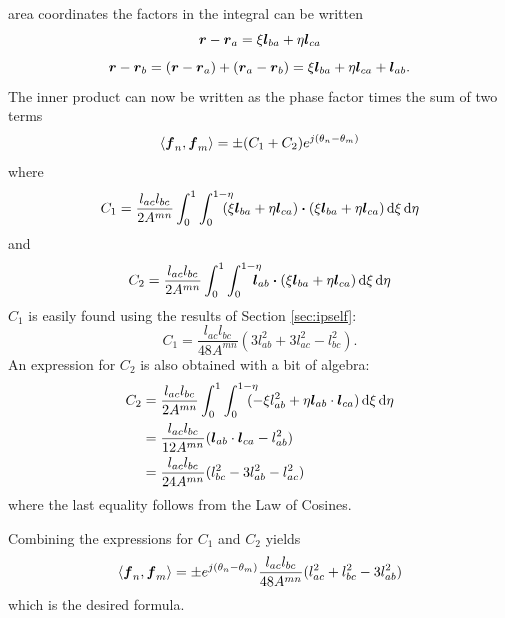 \documentclass[
letterpaper, %
11pt, %
oneside, 
onecolumn, %
openany, %
]{memoir}
\numberwithin{equation}{chapter}
\numberwithin{figure}{chapter}
\begin{document}
area coordinates the factors in the integral can be written
\begin{equation}
  \boldsymbol{r} - \boldsymbol{r}_a = \xi \boldsymbol{l}_{ba} + \eta \boldsymbol{l}_{ca}
\end{equation}
\begin{equation}
  \boldsymbol{r} - \boldsymbol{r}_b = (\boldsymbol{r}-\boldsymbol{r}_a) + (\boldsymbol{r}_a - \boldsymbol{r}_b) = \xi \boldsymbol{l}_{ba} + \eta \boldsymbol{l}_{ca} + 
                                  \boldsymbol{l}_{ab}.
\end{equation}
The inner product can now be written as the phase factor times the 
sum of two terms
\begin{equation}
  \left< \boldsymbol{f}_n, \boldsymbol{f}_m \right> = \pm (C_1 + C_2) e^{j(\theta_n-\theta_m)}
\end{equation}
 where
\begin{equation}
  C_1 =  \frac{l_{ac}l_{bc}}{2A^{mn}}\int_0^1 \int_0^{1-\eta}
  \!\!\!\!\!
              (\xi\boldsymbol{l}_{ba} + \eta\boldsymbol{l}_{ca}) \boldsymbol{\cdot}
              (\xi\boldsymbol{l}_{ba} + \eta\boldsymbol{l}_{ca})  \, \text{d}\xi\, \text{d}\eta  
\end{equation}
and
\begin{equation}
  C_2 =  \frac{l_{ac}l_{bc}}{2A^{mn}}\int_0^1 \int_0^{1-\eta}
  \!\!\!\!\!  \boldsymbol{l}_{ab}  \boldsymbol{\cdot}
              (\xi\boldsymbol{l}_{ba} + \eta\boldsymbol{l}_{ca})  \, \text{d}\xi\, \text{d}\eta  
\end{equation}
$C_1$ is easily found using the results of Section \ref{sec:ipself}:
\begin{equation}                                  
  C_1 = \frac{l_{ac}l_{bc}}{48A^{mn}}
       (3l_{ab}^2 + 3l_{ac}^2 - l_{bc}^2).
\end{equation}
An expression for $C_2$ is also obtained with a bit of algebra:
\begin{align}
  C_2 &= \frac{l_{ac}l_{bc}}{2A^{mn}}\int_0^1 \int_0 ^{1-\eta}
  \!\!\!\!\!
           (-\xi l_{ab}^2 + \eta \boldsymbol{l}_{ab} \cdot \boldsymbol{l}_{ca} ) \, \text{d}\xi \, \text{d}\eta
                   \nonumber \\
       &=  \frac{l_{ac}l_{bc}}{12A^{mn}} ( \boldsymbol{l}_{ab} \cdot \boldsymbol{l}_{ca} - l_{ab}^2)
                   \nonumber \\
       & =  \frac{l_{ac}l_{bc}}{24 A^{mn}} (l_{bc}^2 - 3l_{ab}^2 - l_{ac}^2)
\end{align}
where the last equality follows from the Law of Cosines.

Combining the expressions for $C_1$ and $C_2$ yields
\begin{equation}
  \left< \boldsymbol{f}_n,\boldsymbol{f}_m \right> = \pm e^{j(\theta_n-\theta_m)}
  \frac{l_{ac}l_{bc}}{48A^{mn}}(l_{ac}^2+l_{bc}^2 
                               - 3 l_{ab}^2)
\end{equation}
which is the desired formula.



\backmatter




\end{document}

